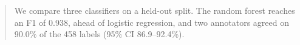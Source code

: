 \begin{abstract}
We compare three classifiers on a held-out split. The random forest reaches an F1 of 0.938,
ahead of logistic regression, and two annotators agreed on 90.0\% of the 458 labels
(95\% CI 86.9--92.4\%).
\end{abstract}
